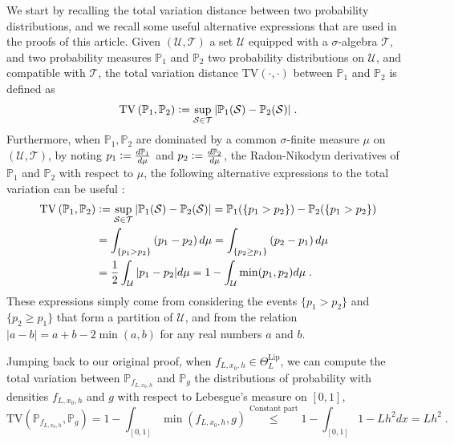 \documentclass[10pt]{article} %
\newcommand{\Prob}[0]{\mathbb{P}}
\newcommand{\eqdef}{\vcentcolon=}
\newcommand\set[1]{\mathcal{#1}}
\newcommand\tv[2]{\mathrm{TV}\left( {#1}, {#2} \right)}
\newcommand\p[1]{\left( {#1}\right)}
\begin{document}
We start by %
recalling the total variation distance between two probability distributions, and we recall some useful alternative expressions that are used in the proofs of this article.
Given $(\set{U}, \set{T})$ a set $\set{U}$ equipped with a $\sigma$-algebra $\set{T}$, and two probability measures $\Prob_1$ and $\Prob_2$ two probability distributions on $\set{U}$, and compatible with $\set{T}$, the total variation distance $\tv{\cdot}{\cdot}$ between $\Prob_1$ and $\Prob_2$ is defined as 
\begin{equation*}
    \tv{\Prob_1}{\Prob_2} \eqdef \sup_{\set{S} \in \set{T}} |\Prob_1(\set{S}) - \Prob_2(\set{S}) | \;.
\end{equation*}
Furthermore, when $\Prob_1, \Prob_2$ are dominated by a common $\sigma$-finite measure $\mu$ on $(\set{U}, \set{T})$, by noting $p_1 \eqdef \frac{d \Prob_1}{ d \mu }$ and $p_2 \eqdef \frac{d \Prob_2}{ d \mu }$, the Radon-Nikodym derivatives of $\Prob_1$ and $\Prob_2$ with respect to $\mu$, the following alternative expressions to the total variation can be useful :
\begin{equation*}
\begin{aligned}
    \tv{\Prob_1}{\Prob_2} &\eqdef \sup_{\set{S} \in \set{T}} |\Prob_1(\set{S}) - \Prob_2(\set{S}) | %
    = \Prob_1(\{ p_1 > p_2 \}) - \Prob_2(\{ p_1 > p_2 \}) \\
    &= \int_{\{ p_1 > p_2 \}} \p{p_1 - p_2} d \mu %
    = \int_{\{ p_2 \geq p_1 \}} \p{p_2 - p_1} d \mu \\
    &= \frac{1}{2} \int_{\set{U}} |p_1 - p_2| d \mu %
    = 1 - \int_{\set{U}} \min(p_1, p_2) d \mu\;.
\end{aligned}
\end{equation*}
These expressions simply come from considering the events $\{ p_1 > p_2 \}$ and $\{ p_2 \geq p_1 \}$ that form a partition of $\set{U}$, and from the relation $|a - b| = a + b - 2 \min(a, b)$ for any real numbers $a$ and $b$.

Jumping back to our original proof, when $f_{L, x_0, h} \in \Theta^{\text{Lip}}_L$, we can compute the total variation between $\Prob_{f_{L, x_0, h}}$ and  $\Prob_{g}$ the distributions of probability with densities $f_{L, x_0, h}$ and $g$ with respect to Lebesgue's measure on $[0, 1]$, 
\begin{equation}
\label{eq:jnbcdshgvdy}
    \tv{\Prob_{f_{L, x_0, h}}}{\Prob_{g}} 
    = 
    1 - \int_{[0, 1]} \min \p{f_{L, x_0, h}, g}
    \stackrel{\text{Constant part}}{\leq }
    1 - \int_{[0, 1]} 1 - Lh^2 dx = Lh^2 \;.
\end{equation}
\end{document}
